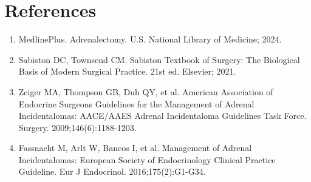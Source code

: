 \section*{References}
\begin{enumerate}
  \item MedlinePlus. Adrenalectomy. U.S. National Library of Medicine; 2024.
  \item Sabiston DC, Townsend CM. Sabiston Textbook of Surgery: The Biological Basis of Modern Surgical Practice. 21st ed. Elsevier; 2021.
  \item Zeiger MA, Thompson GB, Duh QY, et al. American Association of Endocrine Surgeons Guidelines for the Management of Adrenal Incidentalomas: AACE/AAES Adrenal Incidentaloma Guidelines Task Force. Surgery. 2009;146(6):1188-1203.
  \item Fassnacht M, Arlt W, Bancos I, et al. Management of Adrenal Incidentalomas: European Society of Endocrinology Clinical Practice Guideline. Eur J Endocrinol. 2016;175(2):G1-G34.
\end{enumerate}

\clearpage
